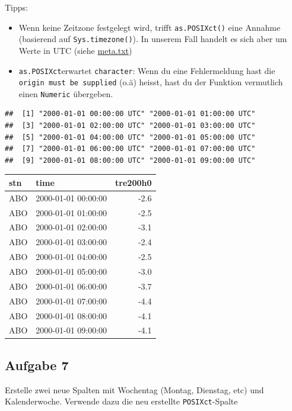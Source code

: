 \documentclass[]{book}
\providecommand{\tightlist}{%
  \setlength{\itemsep}{0pt}\setlength{\parskip}{0pt}}
\begin{document}
Tipps:

\begin{itemize}
\tightlist
\item
  Wenn keine Zeitzone festgelegt wird, trifft \texttt{as.POSIXct()} eine Annahme (basierend auf \texttt{Sys.timezone()}). In unserem Fall handelt es sich aber um Werte in UTC (siehe \href{09_PrePro1/data/meta.txt}{meta.txt})
\item
  \texttt{as.POSIXct}erwartet \texttt{character}: Wenn du eine Fehlermeldung hast die \texttt{\textquotesingle{}origin\textquotesingle{}\ must\ be\ supplied} (o.ä) heisst, hast du der Funktion vermutlich einen \texttt{Numeric} übergeben.
\end{itemize}

\begin{verbatim}
##  [1] "2000-01-01 00:00:00 UTC" "2000-01-01 01:00:00 UTC"
##  [3] "2000-01-01 02:00:00 UTC" "2000-01-01 03:00:00 UTC"
##  [5] "2000-01-01 04:00:00 UTC" "2000-01-01 05:00:00 UTC"
##  [7] "2000-01-01 06:00:00 UTC" "2000-01-01 07:00:00 UTC"
##  [9] "2000-01-01 08:00:00 UTC" "2000-01-01 09:00:00 UTC"
\end{verbatim}

\begin{tabular}{l|l|r}
\hline
stn & time & tre200h0\\
\hline
ABO & 2000-01-01 00:00:00 & -2.6\\
\hline
ABO & 2000-01-01 01:00:00 & -2.5\\
\hline
ABO & 2000-01-01 02:00:00 & -3.1\\
\hline
ABO & 2000-01-01 03:00:00 & -2.4\\
\hline
ABO & 2000-01-01 04:00:00 & -2.5\\
\hline
ABO & 2000-01-01 05:00:00 & -3.0\\
\hline
ABO & 2000-01-01 06:00:00 & -3.7\\
\hline
ABO & 2000-01-01 07:00:00 & -4.4\\
\hline
ABO & 2000-01-01 08:00:00 & -4.1\\
\hline
ABO & 2000-01-01 09:00:00 & -4.1\\
\hline
\end{tabular}

\hypertarget{aufgabe-7}{%
\subsection{Aufgabe 7}\label{aufgabe-7}}

Erstelle zwei neue Spalten mit Wochentag (Montag, Dienstag, etc) und Kalenderwoche. Verwende dazu die neu erstellte \texttt{POSIXct}-Spalte
\end{document}
